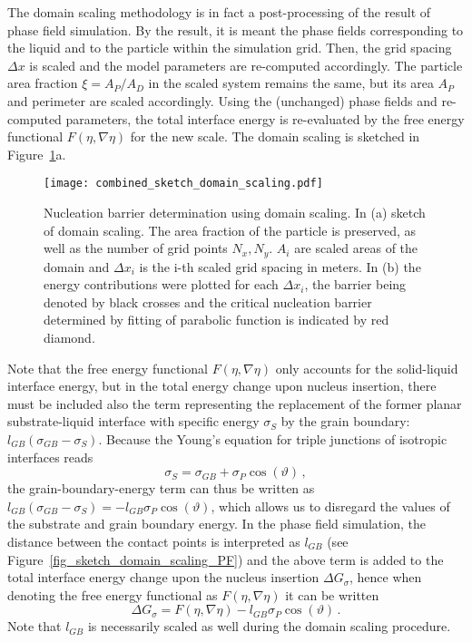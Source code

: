 The domain scaling methodology is in fact a post-processing of the result of phase field simulation. By the result, it is meant the phase fields corresponding to the liquid and to the particle within the simulation grid. Then, the grid spacing $\Delta x$ is scaled and the model parameters are re-computed accordingly. The particle area fraction $\xi=A_P/A_D$ in the scaled system remains the same, but its area $A_P$ and perimeter are scaled accordingly. Using the (unchanged) phase fields and re-computed parameters, the total interface energy is re-evaluated by the free energy functional $F(\eta,\nabla\eta)$ for the new scale. The domain scaling is sketched in Figure~\ref{fig_domain_scaling}a. 

\begin{figure}
	\centering
	\texttt{[image: combined\_sketch\_domain\_scaling.pdf]}
	\caption[Nucleation barrier determination using domain scaling]{Nucleation barrier determination using domain scaling. In (a) sketch of domain scaling. The area fraction of the particle is preserved, as well as the number of grid points $N_x, N_y$. $A_i$ are scaled areas of the domain and $\Delta x_i$ is the i-th scaled grid spacing in meters. In (b) the energy contributions were plotted for each $\Delta x_i$, the barrier being denoted by black crosses and the critical nucleation barrier determined by fitting of parabolic function is indicated by red diamond.}
	\label{fig_domain_scaling}
\end{figure}	

Note that the free energy functional $F(\eta,\nabla\eta)$ only accounts for the solid-liquid interface energy, but in the total energy change upon nucleus insertion, there must be included also the term representing the replacement of the former planar substrate-liquid interface with specific energy $\sigma_S$ by the grain boundary: $l_{GB}(\sigma_{GB}-\sigma_S)$. Because the Young's equation for triple junctions of isotropic interfaces reads
\begin{equation}\label{eq_young_iso}
	\sigma_S = \sigma_{GB}+\sigma_P\cos(\vartheta) \,,
\end{equation}
the grain-boundary-energy term can thus be written as $l_{GB}(\sigma_{GB}-\sigma_S)=-l_{GB}\sigma_P\cos(\vartheta)$, which allows us to disregard the values of the substrate and grain boundary energy. In the phase field simulation, the distance between the contact points is interpreted as $l_{GB}$ (see Figure~\ref{fig_sketch_domain_scaling_PF}) and the above term is added to the total interface energy change upon the nucleus insertion $\Delta G_\sigma$, hence when denoting the free energy functional as $F(\eta,\nabla\eta)$ it can be written
\begin{equation}
	\Delta G_\sigma = F(\eta,\nabla\eta) - l_{GB}\sigma_P\cos(\vartheta) \,.
\end{equation}
Note that $l_{GB}$ is necessarily scaled as well during the domain scaling procedure.

